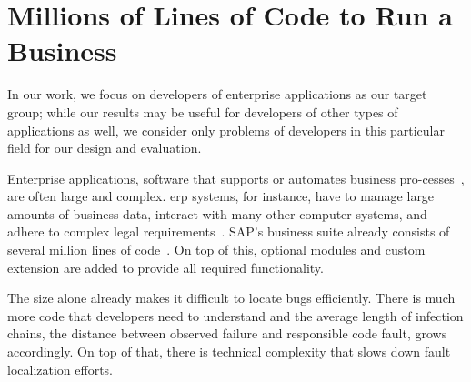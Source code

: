 \section{Millions of Lines of Code to Run a Business}

In our work, we focus on developers of enterprise applications as our target group;
\ie while our results may be useful for developers of other types of applications as well, we consider only problems of developers in this particular field for our design and evaluation.

Enterprise applications, \ie software that supports or automates business pro-\linebreak{}cesses~\cite{fowler02:patterns_of_enterprise_application}, are often large and complex.
\Ac{erp} systems, for instance, have to manage large amounts of business data, interact with many other computer systems, and adhere to complex legal requirements~\cite{linthicum00:enterprise_application_integration}.
SAP’s business suite already consists of several million lines of code~\cite{mallach15:information_systems_what_every}. 
On top of this, optional modules and custom extension are added to provide all required functionality.

The size alone already makes it difficult to locate bugs efficiently.
There is much more code that developers need to understand and the average length of infection chains, the distance between observed failure and responsible code fault, grows accordingly.
On top of that, there is technical complexity that slows down fault localization efforts.


